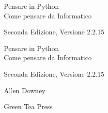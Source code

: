 \documentclass[10pt]{book}
\newcommand{\theversion}{Seconda Edizione, Versione 2.2.15}
\newcommand{\thedate}{}
\begin{document}
\begin{latexonly}

\renewcommand{\blankpage}{\thispagestyle{empty} \quad \newpage}



\thispagestyle{empty}

\begin{flushright}
\vspace*{2.0in}

\begin{spacing}{3}
{\huge Pensare in Python}\\
{\Large Come pensare da Informatico}
\end{spacing}

\vspace{0.25in}

\theversion

\thedate

\vfill

\end{flushright}


\blankpage
\blankpage

\pagebreak
\thispagestyle{empty}

\begin{flushright}
\vspace*{2.0in}

\begin{spacing}{3}
{\huge Pensare in Python}\\
{\Large Come pensare da Informatico}
\end{spacing}

\vspace{0.25in}

\theversion

\thedate

\vspace{1in}


{\Large
Allen Downey\\
}


\vspace{0.5in}

{\Large Green Tea Press}


\end{flushright}
\end{latexonly}
\end{document}

